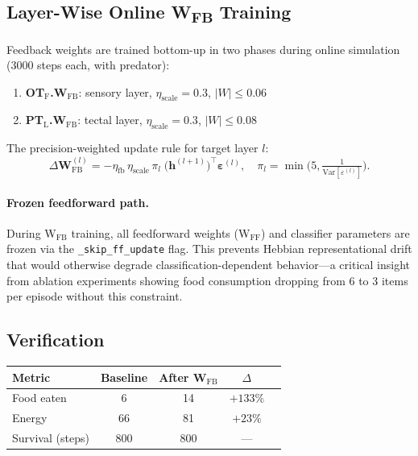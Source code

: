 \documentclass[11pt,a4paper]{article}
\begin{document}
\subsection{Layer-Wise Online W\textsubscript{FB} Training}\label{sec:online_wfb}

Feedback weights are trained bottom-up in two phases during online
simulation (3000 steps each, with predator):

\begin{enumerate}[nosep]
  \item \textbf{OT$_\text{F}$.W$_\text{FB}$}: sensory layer,
    $\eta_\text{scale} = 0.3$, $|W| \leq 0.06$
  \item \textbf{PT$_\text{L}$.W$_\text{FB}$}: tectal layer,
    $\eta_\text{scale} = 0.3$, $|W| \leq 0.08$
\end{enumerate}

The precision-weighted update rule for target layer $l$:
\begin{equation}\label{eq:online_wfb}
  \Delta\mathbf{W}_\text{FB}^{(l)} =
    -\eta_\text{fb}\,\eta_\text{scale}\,\pi_l\;
    \bigl(\mathbf{h}^{(l+1)}\bigr)^\top\boldsymbol{\varepsilon}^{(l)},
  \quad \pi_l = \min\!\bigl(5, \tfrac{1}{\text{Var}[\varepsilon^{(l)}]}\bigr).
\end{equation}

\paragraph{Frozen feedforward path.}
During W$_\text{FB}$ training, all feedforward weights (W$_\text{FF}$) and
classifier parameters are frozen via the \texttt{\_skip\_ff\_update} flag.
This prevents Hebbian representational drift that would otherwise degrade
classification-dependent behavior---a critical insight from ablation
experiments showing food consumption dropping from 6 to 3 items per
episode without this constraint.

\subsection{Verification}\label{sec:wfb_verification}

\begin{center}
\begin{tabular}{lcccc}
\toprule
Metric & Baseline & After W$_\text{FB}$ & $\Delta$ \\
\midrule
Food eaten      & 6   & 14   & $+133\%$ \\
Energy          & 66  & 81   & $+23\%$ \\
Survival (steps) & 800 & 800 & --- \\
\bottomrule
\end{tabular}
\end{center}
\end{document}
